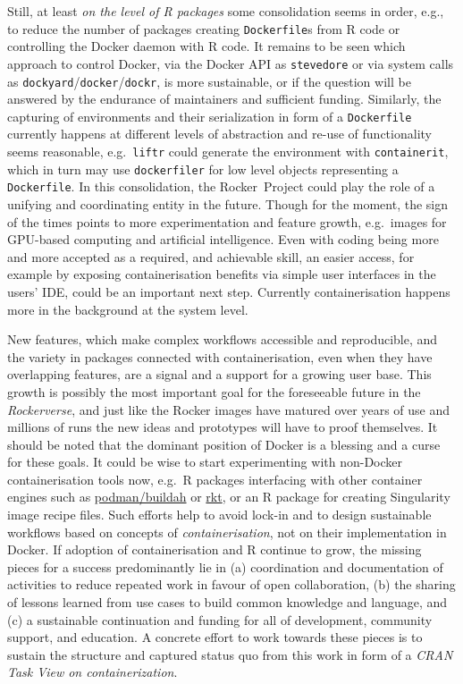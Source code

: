 Still, at least \emph{on the level of R packages} some consolidation
seems in order, e.g., to reduce the number of packages creating
\texttt{Dockerfile}s from R code or controlling the Docker daemon with R
code. It remains to be seen which approach to control Docker, via the
Docker API as \texttt{stevedore} or via system calls as
\texttt{dockyard}/\texttt{docker}/\texttt{dockr}, is more sustainable,
or if the question will be answered by the endurance of maintainers and
sufficient funding. Similarly, the capturing of environments and their
serialization in form of a \texttt{Dockerfile} currently happens at
different levels of abstraction and re-use of functionality seems
reasonable, e.g.~\texttt{liftr} could generate the environment with
\texttt{containerit}, which in turn may use \texttt{dockerfiler} for low
level objects representing a \texttt{Dockerfile}. In this consolidation,
the Rocker~Project could play the role of a unifying and coordinating
entity in the future. Though for the moment, the sign of the times
points to more experimentation and feature growth, e.g.~images for
GPU-based computing and artificial intelligence. Even with coding being
more and more accepted as a required, and achievable skill, an easier
access, for example by exposing containerisation benefits via simple
user interfaces in the users' IDE, could be an important next step.
Currently containerisation happens more in the background at the system
level.

New features, which make complex workflows accessible and reproducible,
and the variety in packages connected with containerisation, even when
they have overlapping features, are a signal and a support for a growing
user base. This growth is possibly the most important goal for the
foreseeable future in the \emph{Rockerverse}, and just like the Rocker
images have matured over years of use and millions of runs the new ideas
and prototypes will have to proof themselves. It should be noted that
the dominant position of Docker is a blessing and a curse for these
goals. It could be wise to start experimenting with non-Docker
containerisation tools now, e.g.~R packages interfacing with other
container engines such as
\href{https://github.com/containers/libpod}{podman/buildah} or
\href{https://coreos.com/rkt/}{rkt}, or an R package for creating
Singularity image recipe files. Such efforts help to avoid lock-in and
to design sustainable workflows based on concepts of
\emph{containerisation}, not on their implementation in Docker. If
adoption of containerisation and R continue to grow, the missing pieces
for a success predominantly lie in (a) coordination and documentation of
activities to reduce repeated work in favour of open collaboration, (b)
the sharing of lessons learned from use cases to build common knowledge
and language, and (c) a sustainable continuation and funding for all of
development, community support, and education. A concrete effort to work
towards these pieces is to sustain the structure and captured status quo
from this work in form of a \emph{CRAN Task View on containerization}.

